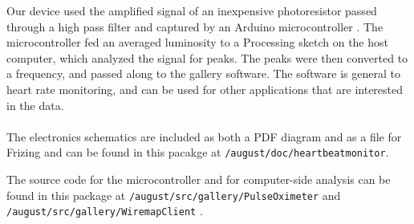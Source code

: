 Our device used the amplified signal of an inexpensive photoresistor passed through a high pass filter and captured by an Arduino microcontroller \cite{ARD}. The microcontroller fed an averaged luminosity to a Processing \cite{P5} sketch on the host computer, which analyzed the signal for peaks. The peaks were then converted to a frequency, and passed along to the gallery software. The software is general to heart rate monitoring, and can be used for other applications that are interested in the data.

\paragraph{}
The electronics schematics are included as both a PDF diagram and as a file for Frizing\cite{FTZ} and can be found in this pacakge at \texttt{/august/doc/heartbeatmonitor}.

The source code for the microcontroller and for computer-side analysis can be found in this package at \texttt{/august/src/gallery/PulseOximeter} and \texttt{/august/src/gallery/WiremapClient} \cite{PACK}.
